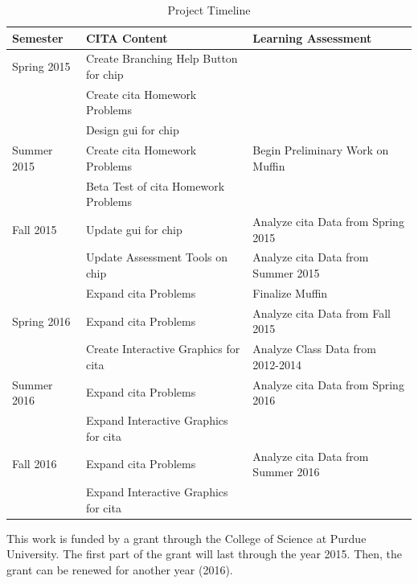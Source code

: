 \begin{landscape}
\begin{table}[!ht]
  \centering
  \begin{tabular}{|l|l|l|}
    \hline
    \textbf{Semester} & \textbf{CITA Content} & \textbf{Learning Assessment}\\
	\hline
	Spring 2015 & Create Branching Help Button for \gls{chip} & \\
	& Create \gls{cita} Homework Problems & \\
	& Design \gls{gui} for \gls{chip} & \\
	\hline
	Summer 2015 & Create \gls{cita} Homework Problems & Begin Preliminary Work on Muffin\\
	& Beta Test of \gls{cita} Homework Problems &  \\
	\hline
	Fall 2015 & Update \gls{gui} for \gls{chip} & Analyze \gls{cita} Data from Spring 2015 \\
	& Update Assessment Tools on \gls{chip} & Analyze \gls{cita} Data from Summer 2015 \\
	& Expand \gls{cita} Problems & Finalize Muffin \\
	\hline
	Spring 2016 & Expand \gls{cita} Problems & Analyze \gls{cita} Data from Fall 2015 \\
	& Create Interactive Graphics for \gls{cita} & Analyze Class Data from 2012-2014 \\
	\hline
	Summer 2016 & Expand \gls{cita} Problems & Analyze \gls{cita} Data from Spring 2016 \\
	& Expand Interactive Graphics for \gls{cita} & \\
	\hline
	Fall 2016 & Expand \gls{cita} Problems & Analyze \gls{cita} Data from Summer 2016 \\
	& Expand Interactive Graphics for \gls{cita} & \\
	\hline
  \end{tabular}
  \caption{Project Timeline}
  \label{tab:timeline}
\end{table}
\end{landscape}

\pagebreak

This work is funded by a grant through the College of Science at Purdue University. The first part of the grant will last through the year 2015. Then, the grant can be renewed for another year (2016).